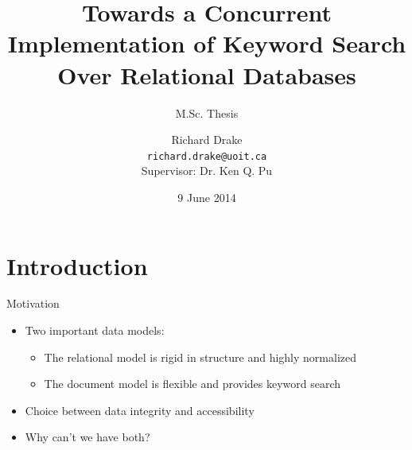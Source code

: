\documentclass[compress]{beamer}
\title[M.Sc. Thesis -- \insertframenumber/\inserttotalframenumber]{Towards a Concurrent Implementation of Keyword Search Over Relational Databases}
\subtitle{M.Sc. Thesis}
\author[\copyright 2014 Richard Drake]{Richard Drake \\ \vspace{0.3em} \scriptsize{\texttt{richard.drake@uoit.ca}} \\ \vspace{1em} \tiny Supervisor:  Dr. Ken Q. Pu}
\institute[UOIT]{University of Ontario Institute of Technology \\ Oshawa, Ontario, Canada}
\date{\tiny 9 June 2014}
\begin{document}
	
	\frame{\maketitle}
	
	
	\section{Introduction}
		\begin{frame}{Motivation}
			\begin{itemize}
				\item Two important data models:
					\begin{itemize}
						\item The \alert{relational model} is rigid in structure and highly normalized
						\item The \alert{document model} is flexible and provides keyword search
					\end{itemize}
				\item Choice between data \alert{integrity} and \alert{accessibility}
				\item Why can't we have both?
			\end{itemize}
		\end{frame}
		
	
\end{document}
